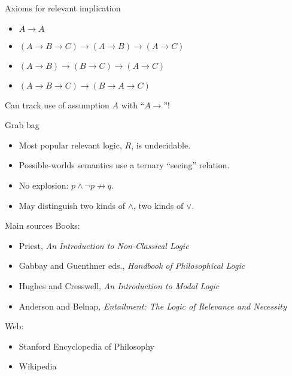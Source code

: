 \documentclass{beamer}
\begin{document}
\begin{frame}{Axioms for relevant implication}
\begin{itemize}
\item $A\to A$
\item $(A\to B\to C)\to (A\to B)\to (A\to C)$
\item $(A\to B)\to (B\to C)\to (A\to C)$
\item $(A\to B\to C)\to (B\to A\to C)$
\end{itemize}
\vfill
Can track use of assumption $A$ with ``$A\to$''!
\end{frame}

\begin{frame}{Grab bag}
\begin{itemize}
\item Most popular relevant logic, $R$, is undecidable.
\item Possible-worlds semantics use a ternary ``seeing'' relation.
\item No explosion: $p\land\lnot p\not\to q$.
\item May distinguish two kinds of $\land$, two kinds of $\lor$.
\end{itemize}
\end{frame}

\begin{frame}{Main sources}
Books:
\begin{itemize}
\item Priest, \textit{An Introduction to Non-Classical Logic}
\item Gabbay and Guenthner eds., \textit{Handbook of Philosophical Logic}
\item Hughes and Cresswell, \textit{An Introduction to Modal Logic}
\item Anderson and Belnap, \textit{Entailment: The Logic of Relevance and Necessity}
\end{itemize}

Web:
\begin{itemize}
\item Stanford Encyclopedia of Philosophy
\item Wikipedia
\end{itemize}
\end{frame}
\end{document}
